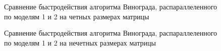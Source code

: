 \documentclass[a4paper, 14pt]{article}
\begin{document}
        \begin{figure}[h]
        	\caption{Сравнение быстродействия алгоритма Винограда, распараллеленного по моделям 1 и 2 на четных размерах матрицы}
        	\label{1-2c}
        \end{figure}   
        \newpage       
        \begin{figure}[h]
        	\caption{Сравнение быстродействия алгоритма Винограда, распараллеленного по моделям 1 и 2 на нечетных размерах матрицы}
        	\label{1-2n}
        \end{figure}
        \newpage  
\end{document}
